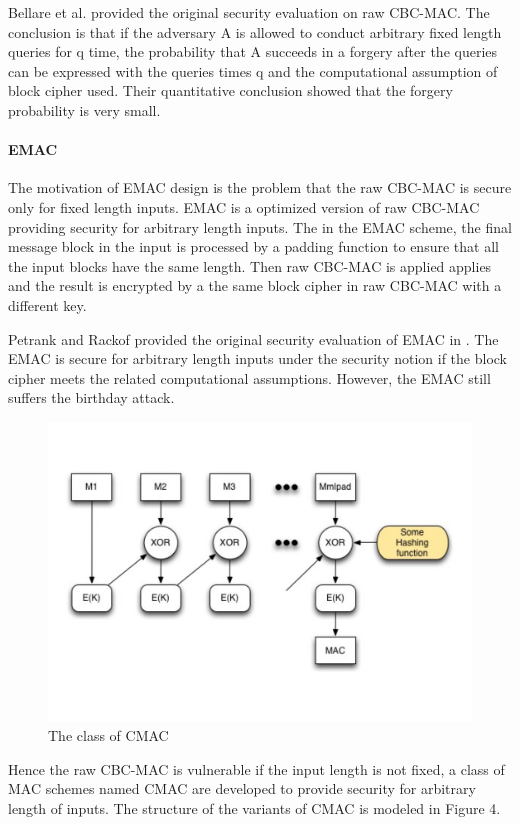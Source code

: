 \documentclass{article}
\begin{document}
Bellare et al. provided the original security evaluation on raw CBC-MAC\cite{cbc1994}. The conclusion is that if the adversary A is allowed to conduct arbitrary fixed length queries for q time, the probability that A succeeds in a forgery after the queries can be expressed with the queries times q and the computational assumption of block cipher used. Their quantitative conclusion showed that the forgery probability is very small.

\paragraph{EMAC}
The motivation of EMAC design is the problem that the raw CBC-MAC is secure only for fixed length inputs. 
EMAC is a optimized version of raw CBC-MAC providing security for arbitrary length inputs. The in the EMAC scheme, the final message block in the input is processed by a padding function to ensure that all the input blocks have the same length. Then raw CBC-MAC is applied applies and the result is encrypted by a the same block cipher in raw CBC-MAC with a different key. 

Petrank and Rackof provided the original security evaluation of EMAC in \cite{emac}. The EMAC is secure for arbitrary length inputs under the security notion if the block cipher meets the related computational assumptions. However, the EMAC still suffers the birthday attack.

\begin{figure}[htbp]
\centering
\includegraphics[scale=0.3]{./diagrams/cmac.pdf}
\caption{The class of CMAC}
\label{CMAC }
\end{figure}
Hence the raw CBC-MAC is vulnerable if the input length is not fixed, a class of MAC schemes named CMAC are developed to provide security for arbitrary length of inputs. The structure of the  variants of CMAC is modeled in Figure 4.
\end{document}
